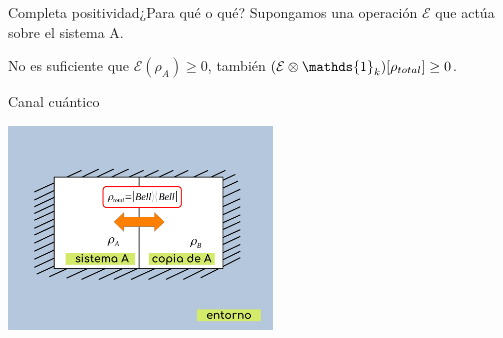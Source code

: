 \documentclass[xcolor=dvipsnames,presentation]{beamer}%
\begin{document}
\begin{frame}{Completa positividad}{¿Para qué o qué?}
	Supongamos una operación $\mathcal{E}$ que actúa sobre 
	el sistema A.
	
	
	No es suficiente que 	$\mathcal{E}(\rho_A)\geq0$, \alert{también 
	$\qty(\mathcal{E}\otimes \mathds{1}_k)\qty[\rho_{total}]\geq0$.}
\end{frame}

\begin{frame}{Canal cuántico}
	\begin{center}
		\includegraphics[width=7cm]{QuantumChannel}
	\end{center}
	\vspace{-.2cm}
\end{frame}
\end{document}
